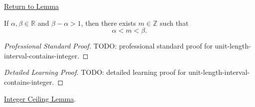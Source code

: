 \newpage
{}
\label{prf:unit-length-interval-contains-integer}

\begin{remark*}[Return]
\hyperref[lem:unit-length-interval-contains-integer]{Return to Lemma}
\end{remark*}

\begin{lemma*}
If $\alpha,\beta\in\mathbb{R}$ and $\beta-\alpha>1$, then there exists
$m\in\mathbb{Z}$ such that
\[
\alpha<m<\beta.
\]
\end{lemma*}

\begin{proof}[Professional Standard Proof]
\LRAProofBodyStart
TODO: professional standard proof for unit-length-interval-contains-integer.
\end{proof}

\begin{proof}[Detailed Learning Proof]
\LRAProofBodyStart
TODO: detailed learning proof for unit-length-interval-contains-integer.
\end{proof}

\begin{remark*}
\end{remark*}

\begin{dependencies}
\hyperref[lem:integer-ceiling-lemma]{Integer Ceiling Lemma}.
\end{dependencies}

\clearpage
